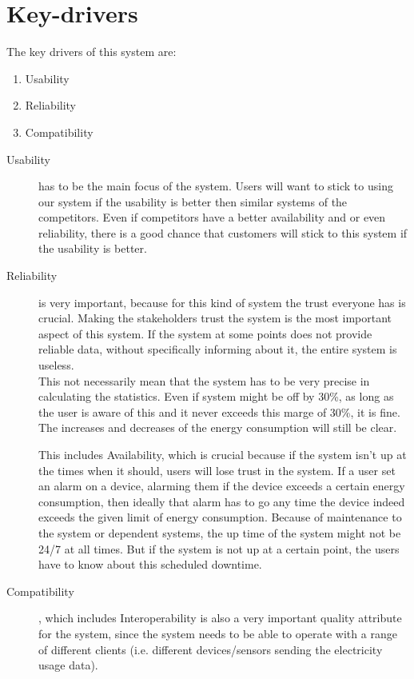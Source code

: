 \section{Key-drivers}
The key drivers of this system are:
\begin{enumerate}
\item Usability
\item Reliability
\item Compatibility
\end{enumerate}

\begin{description}

\item [Usability] has to be the main focus of the system. Users will want to stick to using our system if the usability is better then similar systems of the competitors. Even if competitors have a better availability and or even reliability, there is a good chance that customers will stick to this system if the usability is better. 

\item [Reliability] is very important, because for this kind of system the trust everyone has is crucial. Making the stakeholders trust the system is the most important aspect of this system. If the system at some points does not provide reliable data, without specifically informing about it, the entire system is useless.\\
This not necessarily mean that the system has to be very precise in calculating the statistics. Even if system might be off by 30\%, as long as the user is aware of this and it never exceeds this marge of 30\%, it is fine. The increases and decreases of the energy consumption will still be clear.

This includes Availability, which is crucial because if the system isn't up at the times when it should, users will lose trust in the system. If a user set an alarm on a device, alarming them if the device exceeds a certain energy consumption, then ideally that alarm has to go any time the device indeed exceeds the given limit of energy consumption. Because of maintenance to the system or dependent systems, the up time of the system might not be 24/7 at all times. But if the system is not up at a certain point, the users have to know about this scheduled downtime.

\item [Compatibility], which includes Interoperability is also a very important quality attribute for the system, since the system needs to be able to operate with a range of different clients (i.e. different devices/sensors sending the electricity usage data). 

\end{description}